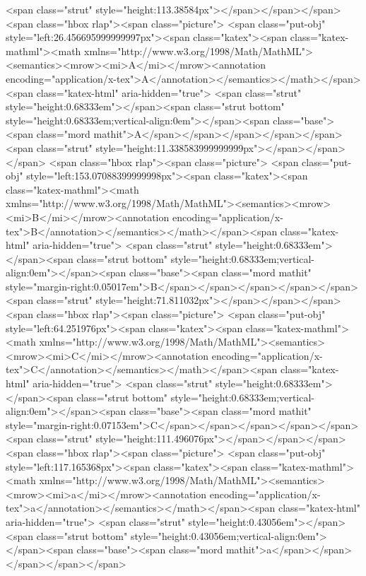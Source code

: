 <span class="strut" style="height:113.38584px"></span></span></span> <span class="hbox rlap"><span class="picture">
<span class="put-obj" style="left:26.456695999999997px"><span class="katex"><span class="katex-mathml"><math xmlns="http://www.w3.org/1998/Math/MathML"><semantics><mrow><mi>A</mi></mrow><annotation encoding="application/x-tex">A</annotation></semantics></math></span><span class="katex-html" aria-hidden="true">
<span class="strut" style="height:0.68333em"></span><span class="strut bottom" style="height:0.68333em;vertical-align:0em"></span><span class="base"><span class="mord mathit">A</span></span></span></span></span>
<span class="strut" style="height:11.338583999999999px"></span></span></span> <span class="hbox rlap"><span class="picture">
<span class="put-obj" style="left:153.07088399999998px"><span class="katex"><span class="katex-mathml"><math xmlns="http://www.w3.org/1998/Math/MathML"><semantics><mrow><mi>B</mi></mrow><annotation encoding="application/x-tex">B</annotation></semantics></math></span><span class="katex-html" aria-hidden="true">
<span class="strut" style="height:0.68333em"></span><span class="strut bottom" style="height:0.68333em;vertical-align:0em"></span><span class="base"><span class="mord mathit" style="margin-right:0.05017em">B</span></span></span></span></span>
<span class="strut" style="height:71.811032px"></span></span></span> <span class="hbox rlap"><span class="picture">
<span class="put-obj" style="left:64.251976px"><span class="katex"><span class="katex-mathml"><math xmlns="http://www.w3.org/1998/Math/MathML"><semantics><mrow><mi>C</mi></mrow><annotation encoding="application/x-tex">C</annotation></semantics></math></span><span class="katex-html" aria-hidden="true">
<span class="strut" style="height:0.68333em"></span><span class="strut bottom" style="height:0.68333em;vertical-align:0em"></span><span class="base"><span class="mord mathit" style="margin-right:0.07153em">C</span></span></span></span></span>
<span class="strut" style="height:111.496076px"></span></span></span> <span class="hbox rlap"><span class="picture">
<span class="put-obj" style="left:117.165368px"><span class="katex"><span class="katex-mathml"><math xmlns="http://www.w3.org/1998/Math/MathML"><semantics><mrow><mi>a</mi></mrow><annotation encoding="application/x-tex">a</annotation></semantics></math></span><span class="katex-html" aria-hidden="true">
<span class="strut" style="height:0.43056em"></span><span class="strut bottom" style="height:0.43056em;vertical-align:0em"></span><span class="base"><span class="mord mathit">a</span></span></span></span></span>
